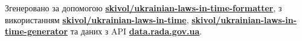 Згенеровано за допомогою \textbf{\href{https://github.com/skivol/ukrainian-laws-in-time-formatter}{skivol/ukrainian-laws-in-time-formatter}},
з використанням \textbf{\href{https://github.com/skivol/ukrainian-laws-in-time}{skivol/ukrainian-laws-in-time}}, \textbf{\href{https://github.com/skivol/ukrainian-laws-in-time-generator}{skivol/ukrainian-laws-in-time-generator}}
та даних з API \textbf{\href{https://data.rada.gov.ua}{data.rada.gov.ua}}.
